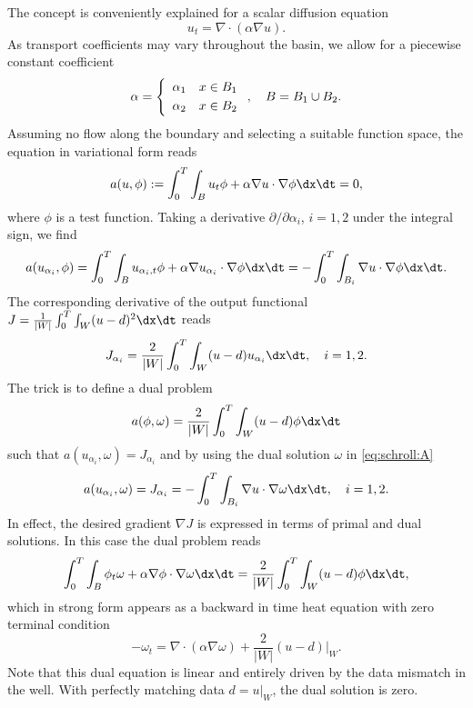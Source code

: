 The concept is conveniently explained for a scalar diffusion equation
\begin{equation}
 u_t = \nabla \cdot (\alpha \nabla u) .
\end{equation}
As transport coefficients may vary throughout the basin,
we allow for a piecewise constant coefficient
\begin{equation}
 \alpha = \left\{
 \begin{array}{rl} \alpha_1 & x \in B_1 \\[\jot] \alpha_2 & x \in B_2 \end{array}
 \right., \quad B = B_1 \cup B_2.
\end{equation}
Assuming no flow along the boundary and selecting a suitable function
space, the equation in variational form reads
\begin{equation}
  a(u, \phi) := \int_0^T \int_B u_t \phi + \alpha \nabla u \cdot \nabla \phi \dx \dt = 0,
\end{equation}
where $\phi$ is a test function.  Taking a derivative $\partial /\partial
\alpha_i$, $i=1,2$ under the integral sign, we find
\begin{equation} \label{eq:schroll:A}
 a(u_{\alpha_i}, \phi) =
 \int_0^T \int_B u_{\alpha_i,t} \phi + \alpha \nabla u_{\alpha_i} \cdot \nabla \phi \dx \dt =
 - \int_0^T \int_{B_i} \nabla u \cdot \nabla \phi \dx \dt.
\end{equation}
The corresponding derivative of the output functional
$J=\frac{1}{|W|}\int_0^T \int_W (u-d)^2 \dx\dt$
reads
\begin{equation}
 J_{\alpha_i} = \frac{2}{|W|} \int_0^T \int_W (u - d) u_{\alpha_i} \dx\dt, \quad i=1,2 .
\end{equation}
The trick is to define a dual problem
\begin{equation}
 a(\phi, \omega) = \frac{2}{|W|} \int_0^T \int_W (u - d) \phi \dx\dt
\end{equation}
such that $a(u_{\alpha_i}, \omega) = J_{\alpha_i}$ and by using the dual
solution $\omega$ in \eqref{eq:schroll:A}
\begin{equation}
 a(u_{\alpha_i}, \omega) =  J_{\alpha_i} = - \int_0^T \int_{B_i} \nabla u \cdot \nabla \omega \dx \dt,
 \quad i=1,2.
\end{equation}
In effect, the desired gradient $\nabla J$ is expressed in terms of
primal and dual solutions. In this case the dual problem reads
\begin{equation} \label{eq:schroll:dual}
 \int_0^T \int_B \phi_t \omega + \alpha \nabla \phi \cdot \nabla \omega \dx \dt =
 \frac{2}{|W|} \int_0^T \int_W (u-d) \phi \dx \dt,
\end{equation}
which in strong form appears as a backward in time heat equation with
zero terminal condition
\begin{equation}
 - \omega_t = \nabla \cdot (\alpha \nabla \omega) + \frac{2}{|W|} (u-d)|_W.
\end{equation}
Note that this dual equation is linear and entirely driven by the data
mismatch in the well.  With perfectly matching data $d=u|_W$, the dual
solution is zero.

